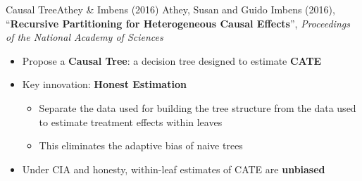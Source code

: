 \documentclass[hyperref={pdfpagelabels=false}]{beamer}
\begin{document}
\begin{frame}{Causal Tree}{Athey \& Imbens (2016)}
	Athey, Susan and Guido Imbens (2016), ``\textbf{Recursive Partitioning for Heterogeneous Causal Effects}'', \textit{Proceedings of the National Academy of Sciences}

	\vspace{0.3cm}
	\begin{itemize}
		\item Propose a \textbf{Causal Tree}: a decision tree designed to estimate \textbf{CATE}
		\vspace{0.2cm}
		\item Key innovation: \textbf{Honest Estimation}
		\vspace{0.2cm}
		\begin{itemize}
			\item Separate the data used for building the tree structure from the data used to estimate treatment effects within leaves
			\vspace{0.2cm}
			\item This eliminates the adaptive bias of naive trees
		\end{itemize}
		\vspace{0.3cm}
		\item Under CIA and honesty, within-leaf estimates of CATE are \textbf{unbiased}
	\end{itemize}
\end{frame}
\end{document}
